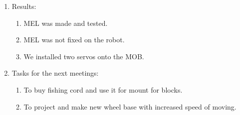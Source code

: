 \begin{enumerate}
\begin{enumerate}
	\end{enumerate}
	
	\item Results:
	\begin{enumerate}
		
		\item MEL was made and tested.
		
		\item MEL was not fixed on the robot.
		
		\item We installed two servos onto the MOB.

	\end{enumerate}
	
	\item Tasks for the next meetings:
	\begin{enumerate}
		
		\item To buy fishing cord and use it for mount for blocks.
		
		\item To project and make new wheel base with increased speed of moving.

	\end{enumerate}
\end{enumerate}
\fillpage
